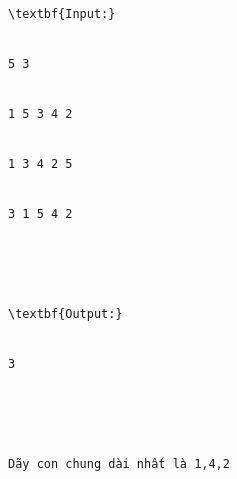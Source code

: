 \begin{verbatim}
\textbf{Input:}


5 3


1 5 3 4 2


1 3 4 2 5


3 1 5 4 2





\textbf{Output:}


3





Dãy con chung dài nhất là 1,4,2


\end{verbatim}